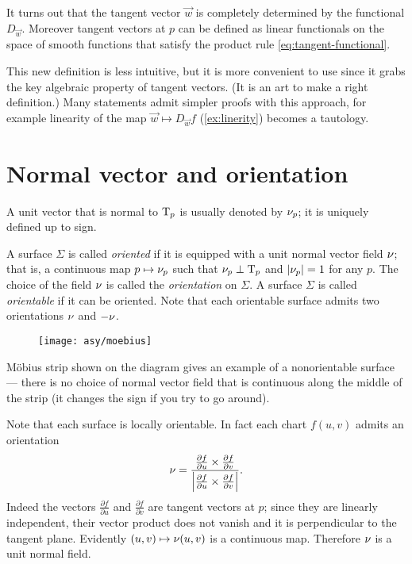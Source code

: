It turns out that the tangent vector $\vec w$ is completely determined by the functional $D_{\vec w}$.
Moreover tangent vectors at $p$ can be defined as linear functionals on the space of smooth functions
that satisfy the product rule \ref{eq:tangent-functional}.

This new definition is less intuitive, but it is more convenient to use since it grabs the key algebraic property of tangent vectors.
(It is an art to make a right definition.) 
Many statements admit simpler proofs with this approach, for example linearity of the map $\vec w\mapsto D_{\vec w}f$ (\ref{ex:linerity}) becomes a tautology.


\section*{Normal vector and orientation}
A unit vector that is normal to $\mathrm{T}_p$ is usually denoted by $\nu_p$;
it is uniquely defined up to sign.

A surface $\Sigma$ is called \emph{oriented} if it is equipped with a unit normal vector field $\nu$;
that is, a continuous map $p\mapsto \nu_p$ such that $\nu_p\perp\mathrm{T}_p$ and $|\nu_p|=1$ for any $p$.
The choice of the field $\nu$ is called the \emph{orientation} on $\Sigma$.
A surface $\Sigma$ is called \emph{orientable} if it can be oriented.
Note that each orientable surface admits two orientations $\nu$ and $-\nu$. %

\begin{wrapfigure}{o}{40 mm}
\vskip-0mm
\centering
\texttt{[image: asy/moebius]}
\vskip0mm
\end{wrapfigure}

M\"obius strip shown on the diagram gives an example of a nonorientable surface --- there is no choice of normal vector field that is continuous along the middle of the strip (it changes the sign if you try to go around).

Note that each surface is locally orientable.
In fact each chart $f(u,v)$ admits an orientation 
\[\nu=
\frac{\tfrac{\partial f}{\partial u}\times \tfrac{\partial f}{\partial v}}
{\left|\tfrac{\partial f}{\partial u}\times \tfrac{\partial f}{\partial v}\right|}.\]
Indeed the vectors $\tfrac{\partial f}{\partial u}$ and $\tfrac{\partial f}{\partial v}$ are tangent vectors at $p$; 
since they are linearly independent, their vector product does not vanish and it is perpendicular to the tangent plane.
Evidently $(u,v)\mapsto \nu(u,v)$ is a continuous map.
Therefore $\nu$ is a unit normal field. 


